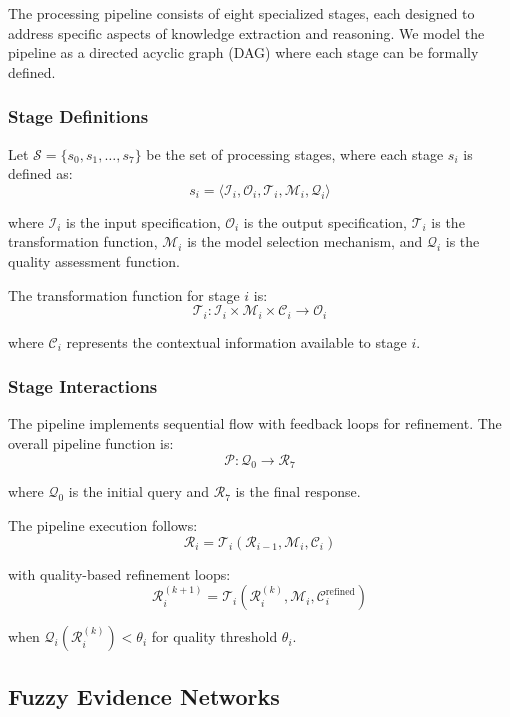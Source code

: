 \documentclass[12pt,a4paper]{article}
\begin{document}
The processing pipeline consists of eight specialized stages, each designed to address specific aspects of knowledge extraction and reasoning. We model the pipeline as a directed acyclic graph (DAG) where each stage can be formally defined.

\subsubsection{Stage Definitions}

Let $\mathcal{S} = \{s_0, s_1, \ldots, s_7\}$ be the set of processing stages, where each stage $s_i$ is defined as:
$$s_i = \langle \mathcal{I}_i, \mathcal{O}_i, \mathcal{T}_i, \mathcal{M}_i, \mathcal{Q}_i \rangle$$

where $\mathcal{I}_i$ is the input specification, $\mathcal{O}_i$ is the output specification, $\mathcal{T}_i$ is the transformation function, $\mathcal{M}_i$ is the model selection mechanism, and $\mathcal{Q}_i$ is the quality assessment function.

The transformation function for stage $i$ is:
$$\mathcal{T}_i: \mathcal{I}_i \times \mathcal{M}_i \times \mathcal{C}_i \rightarrow \mathcal{O}_i$$

where $\mathcal{C}_i$ represents the contextual information available to stage $i$.

\subsubsection{Stage Interactions}

The pipeline implements sequential flow with feedback loops for refinement. The overall pipeline function is:
$$\mathcal{P}: \mathcal{Q}_0 \rightarrow \mathcal{R}_7$$

where $\mathcal{Q}_0$ is the initial query and $\mathcal{R}_7$ is the final response.

The pipeline execution follows:
$$\mathcal{R}_i = \mathcal{T}_i(\mathcal{R}_{i-1}, \mathcal{M}_i, \mathcal{C}_i)$$

with quality-based refinement loops:
$$\mathcal{R}_i^{(k+1)} = \mathcal{T}_i(\mathcal{R}_i^{(k)}, \mathcal{M}_i, \mathcal{C}_i^{\text{refined}})$$

when $\mathcal{Q}_i(\mathcal{R}_i^{(k)}) < \theta_i$ for quality threshold $\theta_i$.

\subsection{Fuzzy Evidence Networks}
\end{document}
